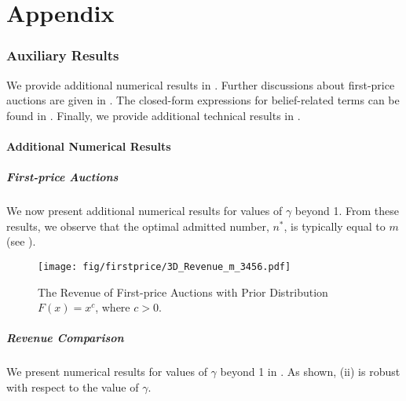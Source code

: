 
\part*{Appendix} 
\parttoc %

\setcounter{equation}{0}
\setcounter{proposition}{0}
\setcounter{lemma}{0}
\setcounter{figure}{0}


\section{Auxiliary Results}
\label{app_sec:auxiliary_results}

We provide additional numerical results in . Further discussions about first-price auctions are given in . The closed-form expressions for belief-related terms can be found in  . Finally, we provide additional technical results in .





\subsection{Additional Numerical Results}
\label{app_subsec:numerical}




\subsubsection{First-price Auctions}

We now present additional numerical results for values of $\gamma$ beyond 1. From these results, we observe that the optimal admitted number, $n^\ast$, is typically equal to $m$ (see ).

\begin{figure}[ht]
    \centering
    \texttt{[image: fig/firstprice/3D\_Revenue\_m\_3456.pdf]}
    \caption{The Revenue of First-price Auctions with Prior Distribution $F(x)=x^c$, where $c>0$.}
    \label{fig:rev_3d_first-price}
\end{figure}


\subsubsection{Revenue Comparison}

We present numerical results for values of $\gamma$ beyond 1 in . As shown,  (ii) is robust with respect to the value of $\gamma$.

